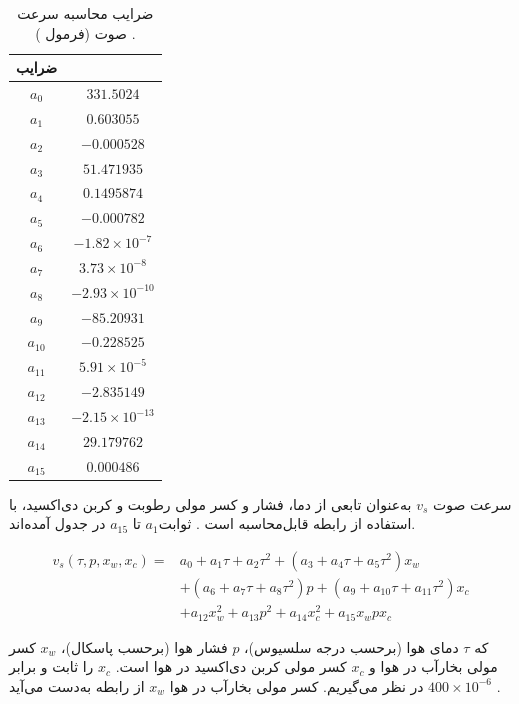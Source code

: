 \begin{table}[!t]
	\centering
	\caption{ضرایب  محاسبه سرعت صوت (فرمول ) .}
	\label{tb:speedOfSoundcoefficients}
	\begin{tabular}{cc}
		\hline \hline
		ضرایب & \\
		\hline
		$a_{0}$ & $331.5024$ \\
		$a_{1}$ & $0.603055$ \\
		$a_{2}$ & $-0.000528$ \\
		$a_{3}$ & $51.471935$ \\
		$a_{4}$ & $0.1495874$ \\
		$a_{5}$ & $-0.000782$ \\
		$a_{6}$ & $-1.82 \times 10^{-7}$ \\
		$a_{7}$ & $3.73 \times 10^{-8}$ \\
		$a_{8}$ & $-2.93 \times 10^{-10}$ \\
		$a_{9}$ & $-85.20931$ \\
		$a_{10}$ & $-0.228525$ \\
		$a_{11}$ & $5.91 \times 10^{-5}$ \\
		$a_{12}$ & $-2.835149$ \\
		$a_{13}$ & $-2.15 \times 10^{-13}$ \\
		$a_{14}$ & $29.179762$ \\
		$a_{15}$ & $0.000486$ \\
		\hline
	\end{tabular}
\end{table}

سرعت صوت $v_s$ به‌عنوان تابعی از دما، فشار و کسر مولی رطوبت و کربن دی‌اکسید، با استفاده از رابطه  قابل‌محاسبه است . ثوابت$a_1$ تا $a_{15}$ در جدول  آمده‌اند.

\begin{equation}\label{eq:soundSpeed}
\begin{aligned}
v_s\left(\tau, p, x_w, x_{c}\right)=& a_{0}+a_{1} \tau+a_{2} \tau^{2}+\left(a_{3}+a_{4} \tau+a_{5} \tau^{2}\right) x_{w} \\
&+\left(a_{6}+a_{7} \tau+a_{8} \tau^{2}\right) p+\left(a_{9}+a_{10} \tau+a_{11} \tau^{2}\right) x_{c} \\
&+a_{12} x_{w}^{2}+a_{13} p^{2}+a_{14} x_{c}^{2}+a_{15} x_w p x_c
\end{aligned}
\end{equation}

که $\tau$ دمای هوا (برحسب درجه سلسیوس)، $p$ فشار هوا (برحسب پاسکال)، $x_w$ کسر مولی بخارآب در هوا و $x_c$ کسر مولی کربن دی‌اکسید در هوا است. $x_c$ را ثابت و برابر $400 \times 10^{-6}$ در نظر می‌گیریم. کسر مولی بخارآب در هوا $x_w$ از رابطه  به‌دست می‌آید . 

